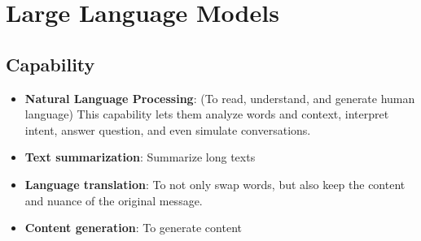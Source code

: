 \documentclass[12pt, letterpaper]{article}
\begin{document}
\section{Large Language Models}

\subsection{Capability}
\begin{itemize}
    \item \textbf{Natural Language Processing}: (To read, understand, and generate human language) This capability lets them analyze words and context, interpret intent, answer question, and even simulate conversations.
    \item \textbf{Text summarization}: Summarize long texts
    \item \textbf{Language translation}: To not only swap words, but also keep the content and nuance of the original message.
    \item \textbf{Content generation}: To generate content
\end{itemize}
\end{document}
